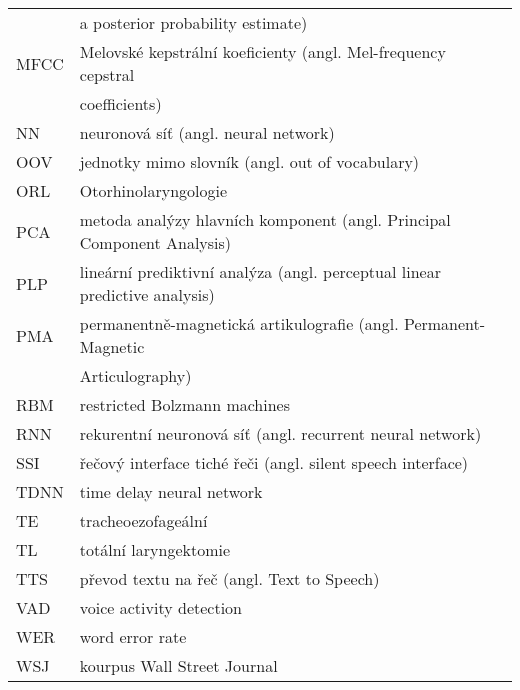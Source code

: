 \begin{longtable}{ll}
     & a posterior probability estimate) \\
MFCC & Melovské kepstrální koeficienty (angl. Mel-frequency cepstral \\
     & coefficients) \\
NN   & neuronová síť (angl. neural network) \\
OOV  & jednotky mimo slovník (angl. out of vocabulary) \\
ORL  & Otorhinolaryngologie \\
PCA  & metoda analýzy hlavních komponent (angl. Principal Component Analysis) \\
PLP  & lineární prediktivní analýza (angl. perceptual linear predictive analysis) \\
PMA  & permanentně-magnetická artikulografie (angl. Permanent-Magnetic \\
     & Articulography) \\
RBM  & restricted Bolzmann machines \\
RNN  & rekurentní neuronová síť (angl. recurrent neural network) \\
SSI  & řečový interface tiché řeči (angl. silent speech interface) \\
TDNN & time delay neural network \\
TE   & tracheoezofageální \\
TL   & totální laryngektomie \\
TTS  & převod textu na řeč (angl. Text to Speech) \\
VAD  & voice activity detection \\
WER  & word error rate \\
WSJ  & kourpus Wall Street Journal \\

\end{longtable}
